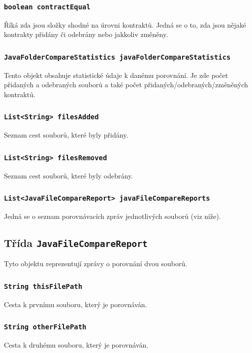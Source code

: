 			\subsubsection{\texttt{boolean contractEqual}}
				Říká zda jsou složky shodné na úrovni kontraktů. Jedná se o to, zda jsou nějaké kontrakty přidány či odebrány nebo jakkoliv změněny.
				
			\subsubsection{\texttt{JavaFolderCompareStatistics javaFolderCompareStatistics}}
				Tento objekt obsahuje statistické údaje k danému porovnání. Je zde počet přidaných a odebraných souborů a také počet přidaných/odebraných/změněných kontraktů. 
			
			\subsubsection{\texttt{List<String> filesAdded}}
				Seznam cest souborů, které byly přidány.
				
			\subsubsection{\texttt{List<String> filesRemoved}}
				Seznam cest souborů, které byly odebrány.
				
			\subsubsection{\texttt{List<JavaFileCompareReport> javaFileCompareReports}}
				Jedná se o seznam porovnávacích zpráv jednotlivých souborů (viz níže). 
				
				
		\subsection{Třída \texttt{JavaFileCompareReport}}
			Tyto objektu reprezentují zprávy o porovnání dvou souborů.
			
			\subsubsection{\texttt{String thisFilePath}}
				Cesta k prvnímu souboru, který je porovnáván.
				
			\subsubsection{\texttt{String otherFilePath}}
				Cesta k druhému souboru, který je porovnáván.
				
